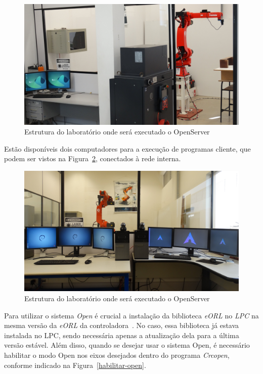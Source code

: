     \begin{figure}[ht]
        \centering
        \includegraphics[width=\columnwidth]{imagens/Fotos/estrutura-lab-1.JPG}
        \small 
        \centering 
        \caption{Estrutura do laboratório onde será executado o OpenServer}
        \label{lab1}
    \end{figure}
    
    Estão disponíveis dois computadores para a execução de programas cliente, que podem ser vistos na Figura~\ref{lab2}, conectados à rede interna.
    
    \begin{figure}[ht]
        \centering
        \includegraphics[width=\columnwidth]{imagens/Fotos/estrutura-lab-2.JPG}
        \small 
        \centering 
        \caption{Estrutura do laboratório onde será executado o OpenServer}
        \label{lab2}
    \end{figure}
        
    Para utilizar o sistema \textit{Open} é crucial a instalação da biblioteca \textit{eORL} no \textit{LPC} na mesma versão da \textit{eORL} da controladora~\citep{Open:Manual}. No caso, essa biblioteca já estava instalada no LPC, sendo necessária apenas a atualização dela para a última versão estável. Além disso, quando se desejar usar o sistema Open, é necessário habilitar o modo Open nos eixos desejados dentro do programa \textit{Crcopen}, conforme indicado na Figura~\ref{habilitar-open}.
    
